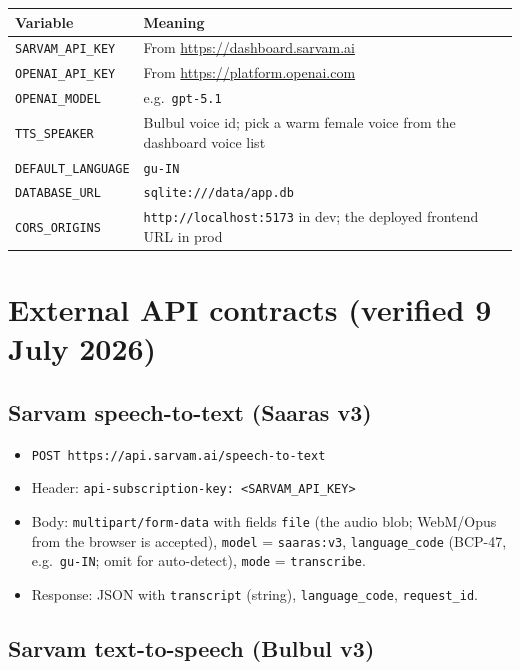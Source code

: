 \documentclass[11pt]{article}
\newcommand{\code}[1]{\texttt{#1}}
\begin{document}
\begin{center}
\begin{tabular}{p{5.2cm} p{8.6cm}}
\toprule
\textbf{Variable} & \textbf{Meaning} \\
\midrule
\code{SARVAM\_API\_KEY} & From \url{https://dashboard.sarvam.ai} \\
\code{OPENAI\_API\_KEY} & From \url{https://platform.openai.com} \\
\code{OPENAI\_MODEL} & e.g.\ \code{gpt-5.1} \\
\code{TTS\_SPEAKER} & Bulbul voice id; pick a warm female voice from the dashboard voice list \\
\code{DEFAULT\_LANGUAGE} & \code{gu-IN} \\
\code{DATABASE\_URL} & \code{sqlite:///data/app.db} \\
\code{CORS\_ORIGINS} & \code{http://localhost:5173} in dev; the deployed frontend URL in prod \\
\bottomrule
\end{tabular}
\end{center}

\section{External API contracts (verified 9 July 2026)}
\label{sec:sarvam}

\subsection{Sarvam speech-to-text (Saaras v3)}

\begin{itemize}
  \item \code{POST https://api.sarvam.ai/speech-to-text}
  \item Header: \code{api-subscription-key: <SARVAM\_API\_KEY>}
  \item Body: \code{multipart/form-data} with fields \code{file} (the audio blob; WebM/Opus from the browser is accepted), \code{model} = \code{saaras:v3}, \code{language\_code} (BCP-47, e.g.\ \code{gu-IN}; omit for auto-detect), \code{mode} = \code{transcribe}.
  \item Response: JSON with \code{transcript} (string), \code{language\_code}, \code{request\_id}.
\end{itemize}

\subsection{Sarvam text-to-speech (Bulbul v3)}
\end{document}
